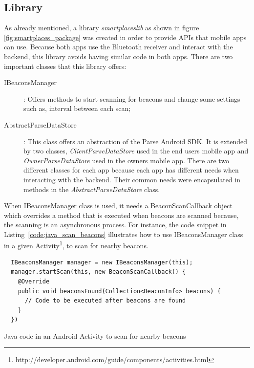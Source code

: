 \subsection{Library}
\label{sub:implementation_library}
As already mentioned, a library \emph{smartplaceslib} as shown in figure \ref{fig:smartplaces_package} was created in order to provide \glspl{API} that mobile apps can
use. Because both apps use the Bluetooth receiver and interact with the backend, this library avoids having similar code in both apps. There are two important classes that this library offers:
\begin{description}
  \item[IBeaconsManager]: Offers methods to start scanning for beacons and change some settings such as, interval between each scan;
  \item[AbstractParseDataStore]: This class offers an abstraction of the Parse Android \gls{SDK}. It is extended by two classes, \emph{ClientParseDataStore} used in the end users mobile app and \emph{OwnerParseDataStore} used in the owners mobile app. There are two different classes for each app because each app has different needs when interacting with the backend. Their common needs were encapsulated in methods in the \emph{AbstractParseDataStore} class.
\end{description}

When IBeaconsManager class is used, it needs a BeaconScanCallback object which overrides a method that is executed when beacons are scanned because, the scanning is an asynchronous process.
For instance, the code snippet in Listing~\ref{code:java_scan_beacons} illustrates how to use IBeaconsManager class in a given
Activity\footnote{http://developer.android.com/guide/components/activities.html}, to scan for nearby beacons.

\begin{listing}[H]
  \begin{verbatim}
  IBeaconsManager manager = new IBeaconsManager(this);
  manager.startScan(this, new BeaconScanCallback() {
    @Override
    public void beaconsFound(Collection<BeaconInfo> beacons) {
      // Code to be executed after beacons are found
    }
  })
  \end{verbatim}
  \caption[Java code for beacon scanning]{Java code in an Android Activity to scan for nearby beacons}
  \label{code:java_scan_beacons}
\end{listing}

